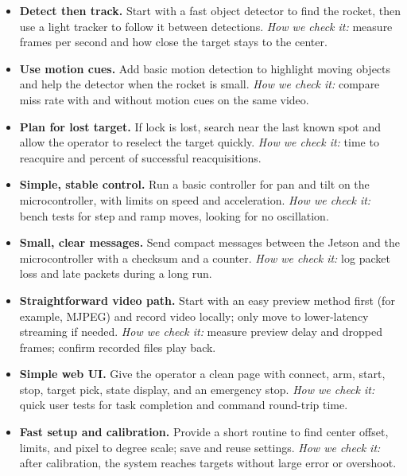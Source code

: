 \documentclass[12pt]{article}
\begin{document}
\begin{itemize}
  \item \textbf{Detect then track.}
  Start with a fast object detector to find the rocket, then use a light tracker to follow it between detections.
  \emph{How we check it:} measure frames per second and how close the target stays to the center.

  \item \textbf{Use motion cues.}
  Add basic motion detection to highlight moving objects and help the detector when the rocket is small.
  \emph{How we check it:} compare miss rate with and without motion cues on the same video.

  \item \textbf{Plan for lost target.}
  If lock is lost, search near the last known spot and allow the operator to reselect the target quickly.
  \emph{How we check it:} time to reacquire and percent of successful reacquisitions.

  \item \textbf{Simple, stable control.}
  Run a basic controller for pan and tilt on the microcontroller, with limits on speed and acceleration.
  \emph{How we check it:} bench tests for step and ramp moves, looking for no oscillation.

  \item \textbf{Small, clear messages.}
  Send compact messages between the Jetson and the microcontroller with a checksum and a counter.
  \emph{How we check it:} log packet loss and late packets during a long run.

  \item \textbf{Straightforward video path.}
  Start with an easy preview method first (for example, MJPEG) and record video locally; only move to lower-latency streaming if needed.
  \emph{How we check it:} measure preview delay and dropped frames; confirm recorded files play back.

  \item \textbf{Simple web UI.}
  Give the operator a clean page with connect, arm, start, stop, target pick, state display, and an emergency stop.
  \emph{How we check it:} quick user tests for task completion and command round-trip time.

  \item \textbf{Fast setup and calibration.}
  Provide a short routine to find center offset, limits, and pixel to degree scale; save and reuse settings.
  \emph{How we check it:} after calibration, the system reaches targets without large error or overshoot.


\end{itemize}
\end{document}
